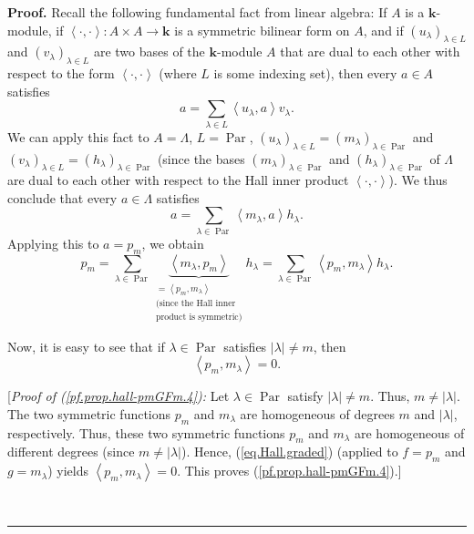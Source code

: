 \documentclass[numbers=enddot,12pt,final,onecolumn,notitlepage]{scrartcl}%
\theoremstyle{definition}
\newenvironment{proof}[1][Proof]{\noindent\textbf{#1.} }{\ \rule{0.5em}{0.5em}}
\let\sumnonlimits\sum
\renewcommand{\sum}{\sumnonlimits\limits}
\newenvironment{verlong}{}{}
\begin{document}
\begin{verlong}
\begin{proof}
Recall the following fundamental fact from linear algebra: If $A$ is a
$\mathbf{k}$-module, if $\left\langle \cdot,\cdot\right\rangle :A\times
A\rightarrow\mathbf{k}$ is a symmetric bilinear form on $A$, and if $\left(
u_{\lambda}\right)  _{\lambda\in L}$ and $\left(  v_{\lambda}\right)
_{\lambda\in L}$ are two bases of the $\mathbf{k}$-module $A$ that are dual to
each other with respect to the form $\left\langle \cdot,\cdot\right\rangle $
(where $L$ is some indexing set), then every $a\in A$ satisfies
\[
a=\sum_{\lambda\in L}\left\langle u_{\lambda},a\right\rangle v_{\lambda}.
\]
We can apply this fact to $A=\Lambda$, $L=\operatorname*{Par}$, $\left(
u_{\lambda}\right)  _{\lambda\in L}=\left(  m_{\lambda}\right)  _{\lambda
\in\operatorname*{Par}}$ and $\left(  v_{\lambda}\right)  _{\lambda\in
L}=\left(  h_{\lambda}\right)  _{\lambda\in\operatorname*{Par}}$ (since the
bases $\left(  m_{\lambda}\right)  _{\lambda\in\operatorname*{Par}}$ and
$\left(  h_{\lambda}\right)  _{\lambda\in\operatorname*{Par}}$ of $\Lambda$
are dual to each other with respect to the Hall inner product $\left\langle
\cdot,\cdot\right\rangle $). We thus conclude that every $a\in\Lambda$
satisfies%
\[
a=\sum_{\lambda\in\operatorname*{Par}}\left\langle m_{\lambda},a\right\rangle
h_{\lambda}.
\]
Applying this to $a=p_{m}$, we obtain%
\begin{equation}
p_{m}=\sum_{\lambda\in\operatorname*{Par}}\underbrace{\left\langle m_{\lambda
},p_{m}\right\rangle }_{\substack{=\left\langle p_{m},m_{\lambda}\right\rangle
\\\text{(since the Hall inner}\\\text{product is symmetric)}}}h_{\lambda}%
=\sum_{\lambda\in\operatorname*{Par}}\left\langle p_{m},m_{\lambda
}\right\rangle h_{\lambda}. \label{pf.prop.hall-pmGFm.3}%
\end{equation}


Now, it is easy to see that if $\lambda\in\operatorname*{Par}$ satisfies
$\left\vert \lambda\right\vert \neq m$, then%
\begin{equation}
\left\langle p_{m},m_{\lambda}\right\rangle =0. \label{pf.prop.hall-pmGFm.4}%
\end{equation}


[\textit{Proof of (\ref{pf.prop.hall-pmGFm.4}):} Let $\lambda\in
\operatorname*{Par}$ satisfy $\left\vert \lambda\right\vert \neq m$. Thus,
$m\neq\left\vert \lambda\right\vert $. The two symmetric functions $p_{m}$ and
$m_{\lambda}$ are homogeneous of degrees $m$ and $\left\vert \lambda
\right\vert $, respectively. Thus, these two symmetric functions $p_{m}$ and
$m_{\lambda}$ are homogeneous of different degrees (since $m\neq\left\vert
\lambda\right\vert $). Hence, (\ref{eq.Hall.graded}) (applied to $f=p_{m}$ and
$g=m_{\lambda}$) yields $\left\langle p_{m},m_{\lambda}\right\rangle =0$. This
proves (\ref{pf.prop.hall-pmGFm.4}).]


\end{proof}
\end{verlong}
\end{document}
